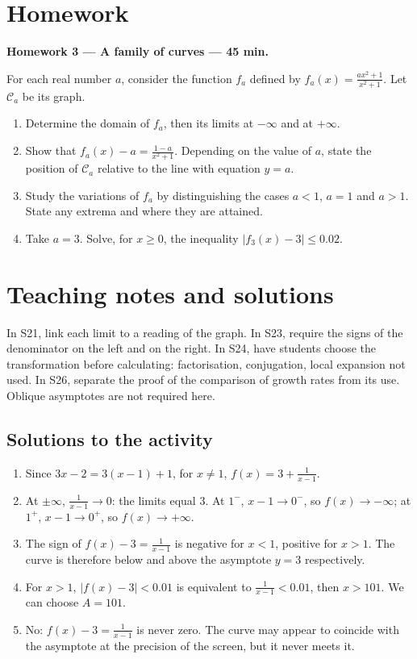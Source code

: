 \mxnewpage
\section{Homework}\textbf{Homework 3 --- A family of curves --- 45 min.}\par For each real number $a$, consider the function $f_a$ defined by $f_a(x)=\frac{ax^2+1}{x^2+1}$. Let $\mathcal C_a$ be its graph.
\begin{enumerate}\item Determine the domain of $f_a$, then its limits at $-\infty$ and at $+\infty$.
\item Show that $f_a(x)-a=\frac{1-a}{x^2+1}$. Depending on the value of $a$, state the position of $\mathcal C_a$ relative to the line with equation $y=a$.
\item Study the variations of $f_a$ by distinguishing the cases $a<1$, $a=1$ and $a>1$. State any extrema and where they are attained.
\item Take $a=3$. Solve, for $x\ge0$, the inequality $|f_3(x)-3|\le\num{0,02}$.\end{enumerate}

\ifmxteacher\mxnewpage\section{Teaching notes and solutions}\begin{teachernote}In S21, link each limit to a reading of the graph. In S23, require the signs of the denominator on the left and on the right. In S24, have students choose the transformation before calculating: factorisation, conjugation, local expansion not used. In S26, separate the proof of the comparison of growth rates from its use. Oblique asymptotes are not required here.\end{teachernote}

\subsection{Solutions to the activity}\begin{enumerate}
\item Since $3x-2=3(x-1)+1$, for $x\ne1$, $f(x)=3+\frac{1}{x-1}$.
\item At $\pm\infty$, $\frac{1}{x-1}\to0$: the limits equal $3$. At $1^-$, $x-1\to0^-$, so $f(x)\to-\infty$; at $1^+$, $x-1\to0^+$, so $f(x)\to+\infty$.
\item The sign of $f(x)-3=\frac{1}{x-1}$ is negative for $x<1$, positive for $x>1$. The curve is therefore below and above the asymptote $y=3$ respectively.
\item For $x>1$, $|f(x)-3|<\num{0,01}$ is equivalent to $\frac{1}{x-1}<\num{0,01}$, then $x>101$. We can choose $A=101$.
\item No: $f(x)-3=\frac{1}{x-1}$ is never zero. The curve may appear to coincide with the asymptote at the precision of the screen, but it never meets it.
\end{enumerate}

